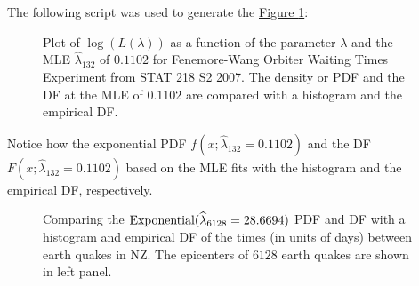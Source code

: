 \begin{example}
The following script was used to generate the \hyperref[F:ExponentialMLE]{Figure \ref*{F:ExponentialMLEOrbiter}}:
\begin{figure}[htpb]
\caption{Plot of $\log(L(\lambda))$ as a function of the parameter $\lambda$  and the MLE $\widehat{\lambda}_{132}$ of $0.1102$ for Fenemore-Wang Orbiter Waiting Times Experiment from STAT 218 S2 2007.  The density or PDF and the DF at the MLE of $0.1102$ are compared with a histogram and the empirical DF.\label{F:ExponentialMLEOrbiter}}
\centering   {}
\end{figure}
Notice how the exponential PDF $f(x;\widehat{\lambda}_{132}=0.1102)$ and the DF $F(x;\widehat{\lambda}_{132}=0.1102)$ based on the MLE fits with the histogram and the empirical DF, respectively.  

\begin{figure}[htpb]
\caption{Comparing the $\mbox{{\rm Exponential}}(\widehat{\lambda}_{6128}= 28.6694)$ PDF and DF with a histogram and empirical DF of the times (in units of days) between earth quakes in  NZ.  The epicenters of $6128$ earth quakes are shown in left panel.\label{F:NZSIEarthQuakesExponentialMLE}}
\centering   {}
\end{figure}
\end{example}

